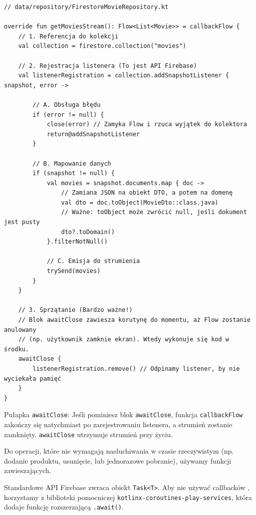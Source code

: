 \begin{verbatim}
// data/repository/FirestoreMovieRepository.kt

override fun getMoviesStream(): Flow<List<Movie>> = callbackFlow {
    // 1. Referencja do kolekcji
    val collection = firestore.collection("movies")

    // 2. Rejestracja listenera (To jest API Firebase)
    val listenerRegistration = collection.addSnapshotListener { snapshot, error ->
        
        // A. Obsługa błędu
        if (error != null) {
            close(error) // Zamyka Flow i rzuca wyjątek do kolektora
            return@addSnapshotListener
        }

        // B. Mapowanie danych
        if (snapshot != null) {
            val movies = snapshot.documents.map { doc ->
                // Zamiana JSON na obiekt DTO, a potem na domenę
                val dto = doc.toObject(MovieDto::class.java)
                // Ważne: toObject może zwrócić null, jeśli dokument jest pusty
                dto?.toDomain() 
            }.filterNotNull()

            // C. Emisja do strumienia
            trySend(movies) 
        }
    }

    // 3. Sprzątanie (Bardzo ważne!)
    // Blok awaitClose zawiesza korutynę do momentu, aż Flow zostanie anulowany
    // (np. użytkownik zamknie ekran). Wtedy wykonuje się kod w środku.
    awaitClose {
        listenerRegistration.remove() // Odpinamy listener, by nie wyciekała pamięć
    }
}
\end{verbatim}

Pułapka \texttt{awaitClose}: Jeśli pominiesz blok \texttt{awaitClose}, funkcja \texttt{callbackFlow} zakończy się natychmiast po zarejestrowaniu listenera, a strumień zostanie zamknięty. \texttt{awaitClose} utrzymuje strumień przy życiu.

Do operacji, które nie wymagają nasłuchiwania w czasie rzeczywistym (np. dodanie produktu, usunięcie, lub jednorazowe pobranie), używamy funkcji zawieszających.

Standardowe API Firebase zwraca obiekt \texttt{Task<T>}. Aby nie używać callbacków , korzystamy z biblioteki pomocniczej \texttt{kotlinx-coroutines-play-services}, która dodaje funkcję rozszerzającą \texttt{.await()}.

